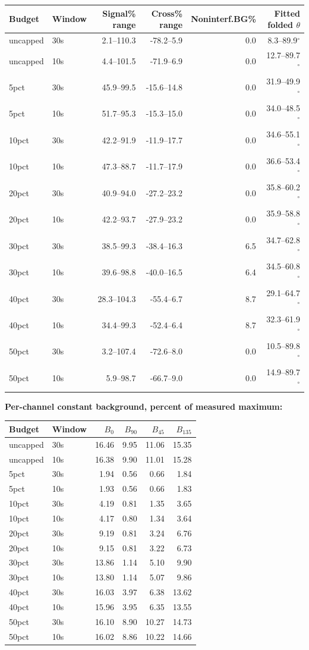 \documentclass[10pt,a4paper]{article}
\begin{document}
\begin{longtable}{llrrrr}\toprule
Budget & Window & Signal\% range & Cross\% range & Noninterf.BG\% & Fitted folded $\theta$\\\midrule\endhead
uncapped & 30s & 2.1--110.3 & -78.2--5.9 & 0.0 & 8.3--89.9$^\circ$ \\
uncapped & 10s & 4.4--101.5 & -71.9--6.9 & 0.0 & 12.7--89.7$^\circ$ \\
5pct & 30s & 45.9--99.5 & -15.6--14.8 & 0.0 & 31.9--49.9$^\circ$ \\
5pct & 10s & 51.7--95.3 & -15.3--15.0 & 0.0 & 34.0--48.5$^\circ$ \\
10pct & 30s & 42.2--91.9 & -11.9--17.7 & 0.0 & 34.6--55.1$^\circ$ \\
10pct & 10s & 47.3--88.7 & -11.7--17.9 & 0.0 & 36.6--53.4$^\circ$ \\
20pct & 30s & 40.9--94.0 & -27.2--23.2 & 0.0 & 35.8--60.2$^\circ$ \\
20pct & 10s & 42.2--93.7 & -27.9--23.2 & 0.0 & 35.9--58.8$^\circ$ \\
30pct & 30s & 38.5--99.3 & -38.4--16.3 & 6.5 & 34.7--62.8$^\circ$ \\
30pct & 10s & 39.6--98.8 & -40.0--16.5 & 6.4 & 34.5--60.8$^\circ$ \\
40pct & 30s & 28.3--104.3 & -55.4--6.7 & 8.7 & 29.1--64.7$^\circ$ \\
40pct & 10s & 34.4--99.3 & -52.4--6.4 & 8.7 & 32.3--61.9$^\circ$ \\
50pct & 30s & 3.2--107.4 & -72.6--8.0 & 0.0 & 10.5--89.8$^\circ$ \\
50pct & 10s & 5.9--98.7 & -66.7--9.0 & 0.0 & 14.9--89.7$^\circ$ \\
\bottomrule\end{longtable}
\textbf{Per-channel constant background, percent of measured maximum:}
\begin{longtable}{llrrrr}\toprule
Budget & Window & $B_0$ & $B_{90}$ & $B_{45}$ & $B_{135}$\\\midrule\endhead
uncapped & 30s & 16.46 & 9.95 & 11.06 & 15.35\\
uncapped & 10s & 16.38 & 9.90 & 11.01 & 15.28\\
5pct & 30s & 1.94 & 0.56 & 0.66 & 1.84\\
5pct & 10s & 1.93 & 0.56 & 0.66 & 1.83\\
10pct & 30s & 4.19 & 0.81 & 1.35 & 3.65\\
10pct & 10s & 4.17 & 0.80 & 1.34 & 3.64\\
20pct & 30s & 9.19 & 0.81 & 3.24 & 6.76\\
20pct & 10s & 9.15 & 0.81 & 3.22 & 6.73\\
30pct & 30s & 13.86 & 1.14 & 5.10 & 9.90\\
30pct & 10s & 13.80 & 1.14 & 5.07 & 9.86\\
40pct & 30s & 16.03 & 3.97 & 6.38 & 13.62\\
40pct & 10s & 15.96 & 3.95 & 6.35 & 13.55\\
50pct & 30s & 16.10 & 8.90 & 10.27 & 14.73\\
50pct & 10s & 16.02 & 8.86 & 10.22 & 14.66\\
\bottomrule\end{longtable}
\newpage
\end{document}
